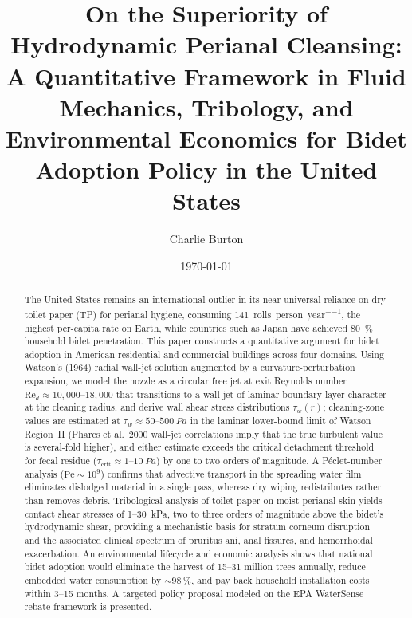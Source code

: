 \documentclass[aps,prfluids,reprint,amsmath,amssymb,floatfix]{revtex4-2}
\newcommand{\Rey}{\mathrm{Re}}
\newcommand{\Pe}{\mathrm{Pe}}
\begin{document}
\title{On the Superiority of Hydrodynamic Perianal Cleansing: A
       Quantitative Framework in Fluid Mechanics, Tribology, and
       Environmental Economics for Bidet Adoption Policy in the
       United States}

\author{Charlie Burton}

\date{\today}

\begin{abstract}
The United States remains an international outlier in its near-universal
reliance on dry toilet paper (TP) for perianal hygiene, consuming
\SI{141}{rolls\per person\per year}, the highest per-capita rate on
Earth, while countries such as Japan have achieved \SI{80}{\%} household
bidet penetration. This paper constructs a quantitative argument
for bidet adoption in American residential and commercial buildings across
four domains. Using Watson's (1964) radial wall-jet solution augmented by a
curvature-perturbation expansion, we model the nozzle as a circular
free jet at exit Reynolds number $\Rey_d \approx 10{,}000$--$18{,}000$
that transitions to a wall jet of laminar boundary-layer character at
the cleaning radius, and derive wall shear stress
distributions $\tau_w(r)$; cleaning-zone values are estimated at
$\tau_w \approx 50$--$\SI{500}{Pa}$ in the laminar lower-bound limit
of Watson Region~II (Phares et al.~2000 wall-jet correlations imply
that the true turbulent value is several-fold higher), and either
estimate exceeds the critical detachment threshold for fecal residue
($\tau_\mathrm{crit} \approx 1$--$\SI{10}{Pa}$) by one to two orders
of magnitude. A P\'{e}clet-number analysis ($\Pe \sim 10^9$)
confirms that advective transport in the spreading water film eliminates
dislodged material in a single pass, whereas dry wiping redistributes
rather than removes debris. Tribological analysis of toilet paper on moist
perianal skin yields contact shear stresses of 1--\SI{30}{kPa}, two to
three orders of magnitude above the bidet's hydrodynamic shear, providing
a mechanistic basis for stratum corneum disruption and the associated
clinical spectrum of pruritus ani, anal fissures, and hemorrhoidal
exacerbation. An environmental lifecycle and economic analysis shows that
national bidet adoption would eliminate the harvest of 15--31 million trees
annually, reduce embedded water consumption by $\sim\SI{98}{\%}$, and pay
back household installation costs within 3--15 months. A targeted policy
proposal modeled on the EPA WaterSense rebate framework is presented.
\end{abstract}
\end{document}
